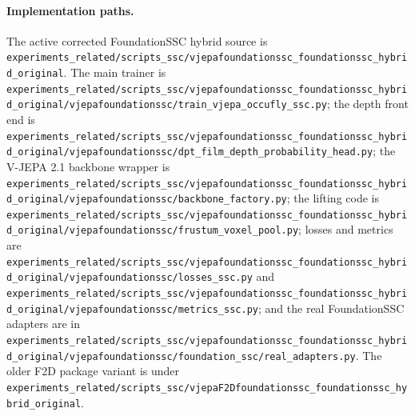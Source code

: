 \documentclass[10pt]{article}
\newcommand{\codepath}[1]{\begingroup\small\nolinkurl{#1}\endgroup}
\begin{document}
\paragraph{Implementation paths.}
The active corrected FoundationSSC hybrid source is \codepath{experiments_related/scripts_ssc/vjepafoundationssc_foundationssc_hybrid_original}.  The main trainer is \codepath{experiments_related/scripts_ssc/vjepafoundationssc_foundationssc_hybrid_original/vjepafoundationssc/train_vjepa_occufly_ssc.py}; the depth front end is \codepath{experiments_related/scripts_ssc/vjepafoundationssc_foundationssc_hybrid_original/vjepafoundationssc/dpt_film_depth_probability_head.py}; the V-JEPA 2.1 backbone wrapper is \codepath{experiments_related/scripts_ssc/vjepafoundationssc_foundationssc_hybrid_original/vjepafoundationssc/backbone_factory.py}; the lifting code is \codepath{experiments_related/scripts_ssc/vjepafoundationssc_foundationssc_hybrid_original/vjepafoundationssc/frustum_voxel_pool.py}; losses and metrics are \codepath{experiments_related/scripts_ssc/vjepafoundationssc_foundationssc_hybrid_original/vjepafoundationssc/losses_ssc.py} and \codepath{experiments_related/scripts_ssc/vjepafoundationssc_foundationssc_hybrid_original/vjepafoundationssc/metrics_ssc.py}; and the real FoundationSSC adapters are in \codepath{experiments_related/scripts_ssc/vjepafoundationssc_foundationssc_hybrid_original/vjepafoundationssc/foundation_ssc/real_adapters.py}.  The older F2D package variant is under \codepath{experiments_related/scripts_ssc/vjepaF2Dfoundationssc_foundationssc_hybrid_original}.

\begin{center}
\end{center}
\end{document}
